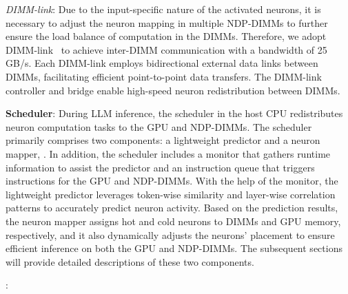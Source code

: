 \textit{DIMM-link}: 
Due to the input-specific nature of the activated neurons, it is necessary to adjust the neuron mapping in multiple NDP-DIMMs to further ensure the load balance of computation in the DIMMs. Therefore, we adopt DIMM-link~\cite{zhou2023dimm} to achieve inter-DIMM communication with a bandwidth of 25 GB/s. Each DIMM-link employs bidirectional external data links between DIMMs, facilitating efficient point-to-point data transfers. The DIMM-link controller and bridge enable high-speed neuron redistribution between DIMMs.

\textbf{Scheduler}:
During LLM inference, the scheduler in the host CPU redistributes neuron computation tasks to the GPU and NDP-DIMMs. The scheduler primarily comprises two components: a lightweight predictor and a neuron mapper, . In addition, the scheduler includes a monitor that gathers runtime information to assist the predictor and an instruction queue that triggers instructions for the GPU and NDP-DIMMs. With the help of the monitor, the lightweight predictor leverages token-wise similarity and layer-wise correlation patterns to accurately predict neuron activity. Based on the prediction results, the neuron mapper assigns hot and cold neurons to DIMMs and GPU memory, respectively, and it also dynamically adjusts the neurons' placement to ensure efficient inference on both the GPU and NDP-DIMMs. The subsequent sections will provide detailed descriptions of these two components. 

\textbf{}:


